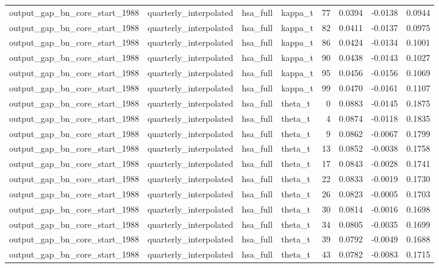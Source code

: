 \begin{tabular}{llllrrrr}
output\_gap\_bn\_core\_start\_1988 & quarterly\_interpolated & hsa\_full & kappa\_t & 77 & 0.0394 & -0.0138 & 0.0944 \\
output\_gap\_bn\_core\_start\_1988 & quarterly\_interpolated & hsa\_full & kappa\_t & 82 & 0.0411 & -0.0137 & 0.0975 \\
output\_gap\_bn\_core\_start\_1988 & quarterly\_interpolated & hsa\_full & kappa\_t & 86 & 0.0424 & -0.0134 & 0.1001 \\
output\_gap\_bn\_core\_start\_1988 & quarterly\_interpolated & hsa\_full & kappa\_t & 90 & 0.0438 & -0.0143 & 0.1027 \\
output\_gap\_bn\_core\_start\_1988 & quarterly\_interpolated & hsa\_full & kappa\_t & 95 & 0.0456 & -0.0156 & 0.1069 \\
output\_gap\_bn\_core\_start\_1988 & quarterly\_interpolated & hsa\_full & kappa\_t & 99 & 0.0470 & -0.0161 & 0.1107 \\
output\_gap\_bn\_core\_start\_1988 & quarterly\_interpolated & hsa\_full & theta\_t & 0 & 0.0883 & -0.0145 & 0.1875 \\
output\_gap\_bn\_core\_start\_1988 & quarterly\_interpolated & hsa\_full & theta\_t & 4 & 0.0874 & -0.0118 & 0.1835 \\
output\_gap\_bn\_core\_start\_1988 & quarterly\_interpolated & hsa\_full & theta\_t & 9 & 0.0862 & -0.0067 & 0.1799 \\
output\_gap\_bn\_core\_start\_1988 & quarterly\_interpolated & hsa\_full & theta\_t & 13 & 0.0852 & -0.0038 & 0.1758 \\
output\_gap\_bn\_core\_start\_1988 & quarterly\_interpolated & hsa\_full & theta\_t & 17 & 0.0843 & -0.0028 & 0.1741 \\
output\_gap\_bn\_core\_start\_1988 & quarterly\_interpolated & hsa\_full & theta\_t & 22 & 0.0833 & -0.0019 & 0.1730 \\
output\_gap\_bn\_core\_start\_1988 & quarterly\_interpolated & hsa\_full & theta\_t & 26 & 0.0823 & -0.0005 & 0.1703 \\
output\_gap\_bn\_core\_start\_1988 & quarterly\_interpolated & hsa\_full & theta\_t & 30 & 0.0814 & -0.0016 & 0.1698 \\
output\_gap\_bn\_core\_start\_1988 & quarterly\_interpolated & hsa\_full & theta\_t & 34 & 0.0805 & -0.0035 & 0.1699 \\
output\_gap\_bn\_core\_start\_1988 & quarterly\_interpolated & hsa\_full & theta\_t & 39 & 0.0792 & -0.0049 & 0.1688 \\
output\_gap\_bn\_core\_start\_1988 & quarterly\_interpolated & hsa\_full & theta\_t & 43 & 0.0782 & -0.0083 & 0.1715 \\

\end{tabular}
